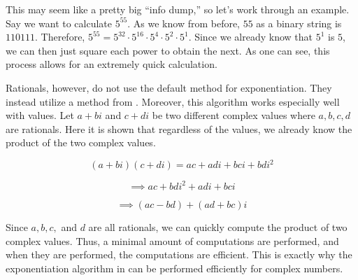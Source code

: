 This may seem like a pretty big ``info dump,'' so let's work through an example.
Say we want to calculate $5^{55}$.
As we know from before, $55$ as a binary string is $110111$.
Therefore, $5^{55} = 5^{32} \cdot 5^{16} \cdot 5^4 \cdot 5^2 \cdot 5^1$.
Since we already know that $5^1$ is $5$, we can then just square each power to obtain the next.
As one can see, this process allows for an extremely quick calculation.

Rationals, however, do not use the default method for exponentiation.
They instead utilize a method from .
Moreover, this algorithm works especially well with  values.
Let $a+bi$ and $c+di$ be two different complex values where $a,b,c,d$ are rationals.
Here it is shown that regardless of the values, we already know the product of the two complex values.

\[
    (a+bi)(c+di) = ac+adi+bci+bdi^2
\]

\[
    \implies ac+bdi^2+adi+bci
\]

\[
    \implies (ac - bd) + (ad + bc)i
\]

Since $a,b,c,$ and $d$ are all rationals, we can quickly compute the product of two complex values.
Thus, a minimal amount of computations are performed, and when they are performed, the computations are efficient.
This is exactly why the exponentiation algorithm in  can be performed efficiently for complex numbers.